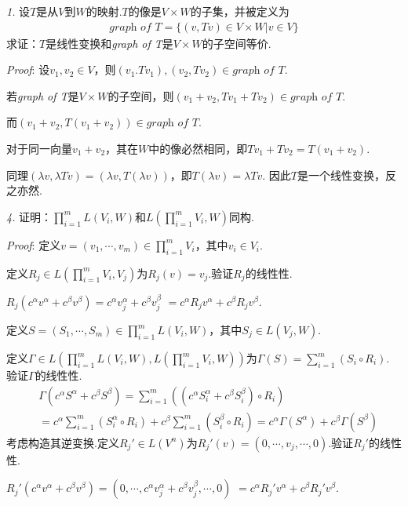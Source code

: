 \textit{1.}
设$T$是从$V$到$W$的映射.$T$的像是$V \times W$的子集，并被定义为
    \begin{align*}
        \textit{graph of T}= \{(v,Tv) \in V \times W |v \in V\}
    \end{align*}
求证：$T$是线性变换和\textit{graph of T}是$V \times W$的子空间等价.

\textit{Proof}:
设$v_1,v_2 \in V$，则$(v_1.Tv_1),(v_2,Tv_2) \in \textit{graph of T}$.

若\textit{graph of T}是$V \times W$的子空间，则$(v_1+v_2,Tv_1+Tv_2) \in \textit{graph of T}$.

而$(v_1+v_2,T(v_1+v_2)) \in \textit{graph of T}$.

对于同一向量$v_1+v_2$，其在$W$中的像必然相同，即$Tv_1+Tv_2=T(v_1+v_2)$.

同理$(\lambda v,\lambda Tv)=(\lambda v,T(\lambda v))$，即$T(\lambda v)=\lambda Tv$.
因此$T$是一个线性变换，反之亦然.

\hspace*{\fill}

\textit{4.}
证明：$\prod_{i=1}^m L(V_i,W)$和$L(\prod_{i=1}^m V_i,W)$同构.

\textit{Proof}:
定义$v=(v_1,\cdots,v_m) \in \prod_{i=1}^m V_i$，其中$v_i \in V_i$.

定义$R_j \in L(\prod_{i=1}^m V_i,V_j)$为$R_j(v)=v_j$.验证$R_j$的线性性.

$R_j(c^\alpha v^\alpha+c^\beta v^\beta)=c^\alpha v_j^\alpha+c^\beta v_j^\beta$
$=c^\alpha R_j v^\alpha+c^\beta R_j v^\beta$.

定义$S=(S_1,\cdots,S_m) \in \prod_{i=1}^m L(V_i,W)$，其中$S_j \in L(V_j,W)$.

定义$\Gamma \in L(\prod_{i=1}^m L(V_i,W),L(\prod_{i=1}^m V_i,W))$为$\Gamma(S)=\sum_{i=1}^m (S_i \circ R_i)$.
验证$\Gamma$的线性性.
    \begin{align*}
        &\Gamma(c^\alpha S^\alpha+c^\beta S^\beta)
        =\sum_{i=1}^m ((c^\alpha S_i^\alpha+c^\beta S_i^\beta) \circ R_i) \\
        &=c^\alpha \sum_{i=1}^m(S_i^\alpha \circ R_i)+c^\beta \sum_{i=1}^m(S_i^\beta \circ R_i)
        =c^\alpha \Gamma(S^\alpha)+c^\beta \Gamma(S^\beta)
    \end{align*}
考虑构造其逆变换.定义$R_j' \in L(V^n)$为$R_j'(v)=(0,\cdots,v_j,\cdots,0)$.验证$R_j'$的线性性.

$R_j'(c^\alpha v^\alpha+c^\beta v^\beta)=(0,\cdots,c^\alpha v_j^\alpha+c^\beta v_j^\beta,\cdots,0)$
$=c^\alpha R_j' v^\alpha+c^\beta R_j' v^\beta$.

